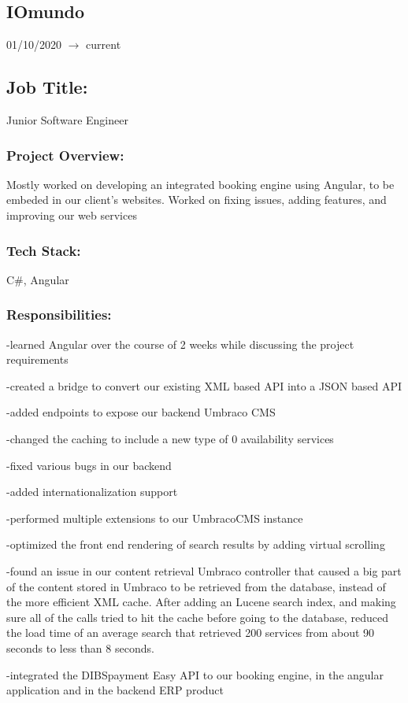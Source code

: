 \documentclass[a4paper,hidelinks,11pt]{article}
\begin{document}
\subsection{IOmundo} 01/10/2020 $\rightarrow$ current
\subsection{Job Title:} Junior Software Engineer
\subsubsection{Project Overview:}
Mostly worked on developing an integrated booking engine using Angular, to be embeded in our client's websites. Worked on fixing issues, adding features, and improving our web services
\subsubsection{Tech Stack:} C\#, Angular
\subsubsection{Responsibilities:}
-learned Angular over the course of 2 weeks while discussing the project requirements

-created a bridge to convert our existing XML based API into a JSON based API

-added endpoints to expose our backend Umbraco CMS

-changed the caching to include a new type of 0 availability services

-fixed various bugs in our backend

-added internationalization support

-performed multiple extensions to our UmbracoCMS instance

-optimized the front end rendering of search results by adding virtual scrolling

-found an issue in our content retrieval Umbraco controller that caused a big part of the content stored in Umbraco to be retrieved from the database, instead of the more efficient XML cache. After adding an Lucene search index, and making sure all of the calls tried to hit the cache before going to the database, reduced the load time of an average search that retrieved 200 services from about 90 seconds to less than 8 seconds.

-integrated the DIBSpayment Easy API to our booking engine, in the angular application and in the backend ERP product
\end{document}
